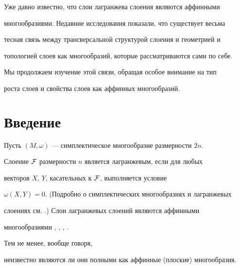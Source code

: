 \pagestyle{plain} %













\maketitle


\label{begin}





Уже давно известно, что слои лагранжева слоения являются аффинными


многообразиями. Недавние исследования показали, что существует весьма


тесная связь между трансверсальной структурой слоения и геометрией и


топологией слоев как многообразий, которые рассматриваются сами по себе.


Мы продолжаем изучение этой связи, обращая особое внимание на тип


роста слоев и свойства слоев как аффинных многообразий.





\section{Введение}





Пусть $(M,\omega)$ --- симплектическое многообразие размерности $2n$.


Слоение $\cal F$ размерности $n$ является лагранжевым, если для любых


векторов $X$, $Y$, касательных к $\cal F$, выполняется условие


$\omega (X,Y) = 0$. (Подробно о симплектических многообразиях и лагранжевых


слоениях см. \cite{WE}.) Слои лагранжевых слоений являются аффинными


многообразиями \cite{LIB}, \cite{WE}, \cite{HE}, \cite{IN}. 


Тем не менее, вообще говоря,


неизвестно являются ли они полными как аффинные (плоские) многообразия.


